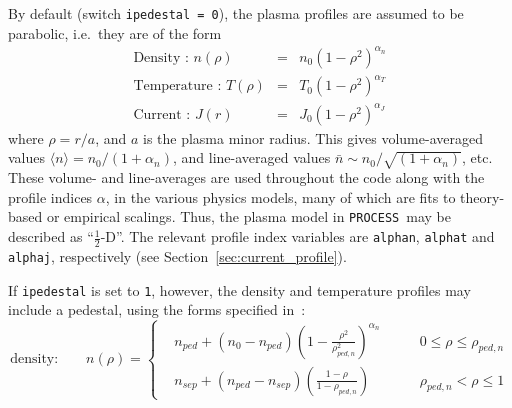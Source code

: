 \documentclass[11pt,a4paper]{report}
\newcommand{\process}{\mbox{\texttt{PROCESS}}}
\begin{document}
By default  (switch \texttt{ipedestal = 0}), the plasma
profiles are assumed to be parabolic, i.e.\ they are of the form
\begin{eqnarray}
\mbox{Density : } n(\rho) & = & n_0 \left( 1 - \rho^2 \right)^{\alpha_n} \\
\mbox{Temperature : } T(\rho) & = & T_0 \left( 1 - \rho^2 \right)^{\alpha_T} \\
\mbox{Current : } J(r) & = & J_0 \left( 1 - \rho^2 \right)^{\alpha_J}
\end{eqnarray}
where $\rho = r/a$, and $a$ is the plasma minor radius. This gives
volume-averaged values $\langle n \rangle = n_0 / (1+\alpha_n)$, and
line-averaged values $\bar{n} \sim n_0 / \sqrt{(1+\alpha_n)}$, etc.  These
volume- and line-averages are used throughout the code along with the profile
indices $\alpha$, in the various physics models, many of which are fits to
theory-based or empirical scalings. Thus, the plasma model in \process\ may
be described as ``$\frac{1}{2}$-D''.  The relevant profile index variables are
\texttt{alphan}, \texttt{alphat} and \texttt{alphaj}, respectively (see
Section~\ref{sec:current_profile}).

If \texttt{ipedestal} is set to \texttt{1}, however, the density and
temperature profiles may include a pedestal, using the forms specified
in~\cite{helios}:
\begin{equation}
\mbox{density:} \qquad n(\rho) = \left\{ 
\begin{aligned}
  &n_{ped} + (n_0 - n_{ped}) \left( 1 -
    \frac{\rho^2}{\rho_{ped,n}^2}\right)^{\alpha_n}
  &\qquad 0 \leq \rho \leq \rho_{ped,n} \\
  &n_{sep} + (n_{ped} - n_{sep})\left( \frac{1- \rho}{1-\rho_{ped,n}}\right)
  &\qquad \rho_{ped,n} < \rho \leq 1
\end{aligned}
\right.
\end{equation}
\end{document}
